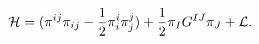 \begin{equation}
{\cal{H}}= (\pi^{ij} \pi_{ij} - \frac{1}{2} \pi^{i}_{i} \pi^{j}_{j})
+\frac{1}{2} \pi_{I} G^{IJ}\pi_{J} + {\cal{L}}.
\end{equation}

